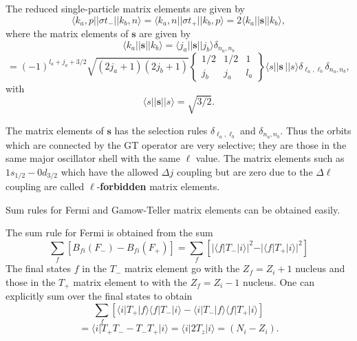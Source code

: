 \documentclass[graybox,sectrefs,envcountresetchap,open=right]{svmonodo}
\begin{document}
The reduced single-particle
matrix elements are given by
\[
\langle k_{a},p\vert\vert \sigma  t_{-}\vert\vert k_{b},n\rangle=\langle k_{a},n\vert\vert \sigma  t_{+}\vert\vert k_{b},p\rangle= 2\langle k_{a}\vert\vert \mathbf{s}\vert\vert k_{b}\rangle, 
\]
where the matrix elements of $\mathbf{s}$ are given by
\[
\langle k_{a}\vert\vert \mathbf{s}\vert\vert k_{b}\rangle=\langle j_{a}\vert\vert \mathbf{s}\vert\vert j_{b}\rangle \delta_{n_{a},n_{b}}
\]
\[
=(-1)^{l_{a}+j_{a}+3/2}
\sqrt{(2j_{a}+1)(2j_{b}+1)}\left\{\begin{array}{ccc}  {1/2}&  {1/2}&  {1} \\ {j_{b}}&  {j_{a}}&  {l_{a}}\end{array}\right\}
\langle s\vert\vert \mathbf{s}\,\vert\vert s\rangle \delta _{\ell _{a},\ell _{b}} \delta_{n_{a},n_{b}}
,
\]
with
\[
\langle s\vert\vert \mathbf{s}\vert\vert s\rangle= \sqrt{3/2}.
\]

The matrix elements of $\mathbf{s}$ has the selection rules $\delta_{ \ell_{a} , \ell_{b} }$
and $\delta_{n _{a} ,n _{b} }$. Thus the orbits which are connected by the GT operator
are very selective; they are those in the same major oscillator shell
with the same $\ell$ value. The matrix elements such as
$1s_{1/2}-0d_{3/2}$ which have the allowed $\Delta j$ coupling but
are zero due to the $\Delta\ell$ coupling are called $\ell$-\textbf{forbidden} matrix
elements.


Sum rules for Fermi and Gamow-Teller matrix elements can be obtained easily.

The sum rule for Fermi is obtained from the sum
\[
\sum _{f} \left[ B_{fi}(F_{-}) - B_{fi}(F_{+}) \right]
=\sum _{f} \left[ \vert \langle f\vert  T_{-} \vert i\rangle\vert ^{2} -  \vert \langle f\vert  T_{+} \vert 
i\rangle\vert ^{2} \right]
\]
The final states $f$ in the $T_{-}$ matrix element go
with the $Z_{f}=Z_{i}+1$ nucleus and those in the $T_{+}$ matrix element
to with the $Z_{f}=Z_{i}-1$ nucleus. One can explicitly sum over the
final states to obtain
\[
\sum _{f} \left[ \langle i\vert  T_{+} \vert f\rangle \langle f\vert T_{-}\vert i\rangle -  \langle i\vert  T_{-} \vert f\rangle \langle f\vert T_{+}\vert i\rangle \right]
\]
\[
= \langle i\vert  T_{+} T_{-} -  T_{-} T_{+}\vert i\rangle =\langle i\vert  2T_{z}\vert i\rangle  = (N_{i}-Z_{i}).       
\]
\end{document}

